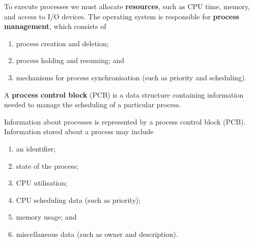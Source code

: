 To execute processes we must allocate \textbf{resources}, such as CPU time, memory, and access to I/O devices. The operating system is responsible for \textbf{process management}, which consists of

\begin{enumerate}
    \item process creation and deletion;
    
    \item process holding and resuming; and
    
    \item mechanisms for process synchronisation (such as priority and scheduling).
\end{enumerate}

\begin{definition}
    A \textbf{process control block} (PCB) is a data structure containing information needed to manage the scheduling of a particular process. 
\end{definition}

Information about processes is represented by a process control block (PCB). Information stored about a process may include

\begin{enumerate}
    \item an identifier;
    
    \item state of the process;
    
    \item CPU utilisation;
    
    \item CPU scheduling data (such as priority);
    
    \item memory usage; and
    
    \item miscellaneous data (such as owner and description).
\end{enumerate}

